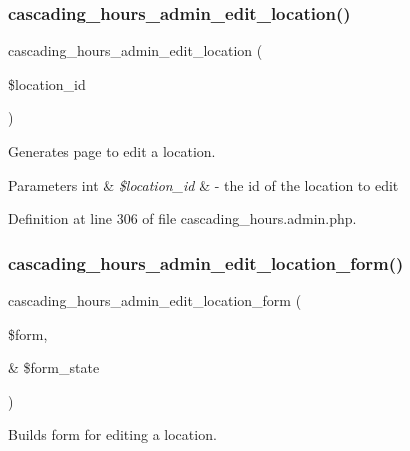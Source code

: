\subsubsection{\texorpdfstring{cascading\+\_\+hours\+\_\+admin\+\_\+edit\+\_\+location()}{cascading\_hours\_admin\_edit\_location()}}
{\footnotesize\ttfamily cascading\+\_\+hours\+\_\+admin\+\_\+edit\+\_\+location (\begin{DoxyParamCaption}\item[{}]{\$location\+\_\+id }\end{DoxyParamCaption})}



Generates page to edit a location. 


\begin{DoxyParams}[1]{Parameters}
int & {\em \$location\+\_\+id} & -\/ the id of the location to edit \\
\hline
\end{DoxyParams}


Definition at line 306 of file cascading\+\_\+hours.\+admin.\+php.

\mbox{\label{cascading__hours_8admin_8php_a8706149902213051645f6b3d5bff772e_a8706149902213051645f6b3d5bff772e}} 
\subsubsection{\texorpdfstring{cascading\+\_\+hours\+\_\+admin\+\_\+edit\+\_\+location\+\_\+form()}{cascading\_hours\_admin\_edit\_location\_form()}}
{\footnotesize\ttfamily cascading\+\_\+hours\+\_\+admin\+\_\+edit\+\_\+location\+\_\+form (\begin{DoxyParamCaption}\item[{}]{\$form,  }\item[{\&}]{\$form\+\_\+state }\end{DoxyParamCaption})}



Builds form for editing a location. 

